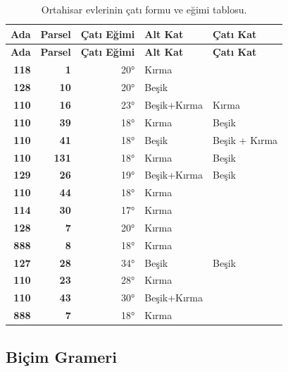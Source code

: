 \documentclass[12pt,turkish,a4paperpaper,]{report}
\begin{document}
\begin{longtable}[]{@{}rrrll@{}}
\caption{Ortahisar evlerinin çatı formu ve eğimi
tablosu.}\tabularnewline
\toprule
\textbf{Ada} & \textbf{Parsel} & \textbf{Çatı Eğimi} & \textbf{Alt Kat}
& \textbf{Çatı Kat}\tabularnewline
\midrule
\endfirsthead
\toprule
\textbf{Ada} & \textbf{Parsel} & \textbf{Çatı Eğimi} & \textbf{Alt Kat}
& \textbf{Çatı Kat}\tabularnewline
\midrule
\endhead
\textbf{118} & \textbf{1} & 20° & Kırma &\tabularnewline
\textbf{128} & \textbf{10} & 20° & Beşik &\tabularnewline
\textbf{110} & \textbf{16} & 23° & Beşik+Kırma & Kırma\tabularnewline
\textbf{110} & \textbf{39} & 18° & Kırma & Beşik\tabularnewline
\textbf{110} & \textbf{41} & 18° & Beşik & Beşik + Kırma\tabularnewline
\textbf{110} & \textbf{131} & 18° & Kırma & Beşik\tabularnewline
\textbf{129} & \textbf{26} & 19° & Beşik+Kırma & Beşik\tabularnewline
\textbf{110} & \textbf{44} & 18° & Kırma &\tabularnewline
\textbf{114} & \textbf{30} & 17° & Kırma &\tabularnewline
\textbf{128} & \textbf{7} & 20° & Kırma &\tabularnewline
\textbf{888} & \textbf{8} & 18° & Kırma &\tabularnewline
\textbf{127} & \textbf{28} & 34° & Beşik & Beşik\tabularnewline
\textbf{110} & \textbf{23} & 28° & Kırma &\tabularnewline
\textbf{110} & \textbf{43} & 30° & Beşik+Kırma &\tabularnewline
\textbf{888} & \textbf{7} & 18° & Kırma &\tabularnewline
\bottomrule
\end{longtable}

\hypertarget{biuxe7im-grameri}{%
\subsection{Biçim Grameri}\label{biuxe7im-grameri}}
\end{document}
